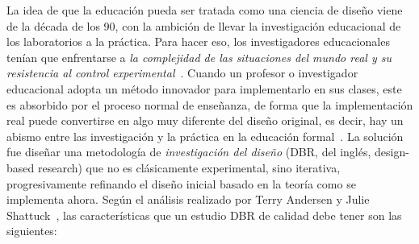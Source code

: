 La idea de que la educación pueda ser tratada como una ciencia de diseño viene de la década de los 90, con la ambición de llevar la investigación educacional de los laboratorios a la práctica. Para hacer eso, los investigadores educacionales tenían que enfrentarse a \emph{la complejidad de las situaciones del mundo real y su resistencia al control experimental}~\cite{collins2004design}. Cuando un profesor o investigador educacional adopta un método innovador para implementarlo en sus clases, este es absorbido por el proceso normal de enseñanza, de forma que la implementación real puede convertirse en algo muy diferente del diseño original, es decir, hay un abismo entre las investigación y la práctica en la educación formal~\cite{anderson2012design}. La solución fue diseñar una metodología de \emph{investigación del diseño} (DBR, del inglés, design-based research) que no es clásicamente experimental, sino iterativa, progresivamente refinando el diseño inicial basado en la teoría como se implementa ahora. Según el análisis realizado por Terry Andersen y Julie Shattuck~\cite{anderson2012design}, las características que un estudio DBR de calidad debe tener son las siguientes:
